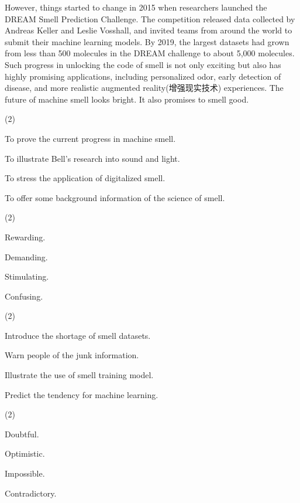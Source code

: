 \documentclass{英语试卷}
\begin{document}
\par However, things started to change in 2015 when researchers launched the DREAM Smell Prediction Challenge. The competition released data collected by Andreas Keller and Leslie Vosshall, and invited teams from around the world to submit their machine learning models. By 2019, the largest datasets had grown from less than 500 molecules in the DREAM challenge to about 5,000 molecules. Such progress in unlocking the code of smell is not only exciting but also has highly promising applications, including personalized odor, early detection of disease, and more realistic augmented reality(增强现实技术) experiences. The future of machine smell looks bright. It also promises to smell good.\par
{}
\begin{choices}(2)
  \item To prove the current progress in machine smell.
  \item To illustrate Bell's research into sound and light.
  \item To stress the application of digitalized smell.
  \item To offer some background information of the science of smell.
\end{choices}
\begin{choices}(2)
  \item Rewarding.
  \item Demanding.
  \item Stimulating.
  \item Confusing.
\end{choices}
\begin{choices}(2)
  \item Introduce the shortage of smell datasets.
  \item Warn people of the junk information.
  \item Illustrate the use of smell training model.
  \item Predict the tendency for machine learning.
\end{choices}
\begin{choices}(2)
  \item Doubtful.
  \item Optimistic.
  \item Impossible.
  \item Contradictory.
\end{choices}
\end{document}
